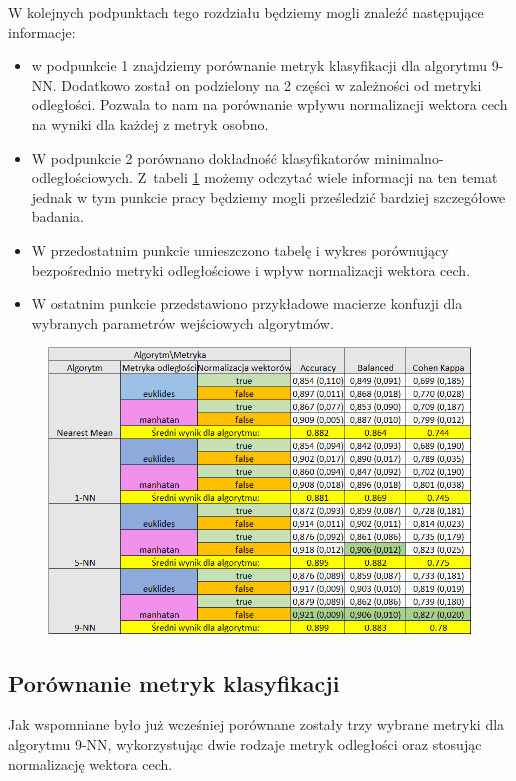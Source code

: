 \documentclass[12pt]{article}
\begin{document}
\noindent W kolejnych podpunktach tego rozdziału będziemy mogli znaleźć następujące informacje:
\begin{itemize}
\item w podpunkcie 1 znajdziemy porównanie metryk klasyfikacji dla algorytmu 9-NN. Dodatkowo został on podzielony na 2 części w zależności od metryki odległości. Pozwala to nam na porównanie wpływu normalizacji wektora cech na wyniki dla każdej z metryk osobno.
\item W podpunkcie 2 porównano dokładność klasyfikatorów minimalno-odległościowych. Z~tabeli \ref{glowna_tabela} możemy odczytać wiele informacji na ten temat jednak w tym punkcie pracy będziemy mogli prześledzić bardziej szczegółowe badania.
\item W przedostatnim punkcie umieszczono tabelę i wykres porównujący bezpośrednio metryki odległościowe i wpływ normalizacji wektora cech.
\item W ostatnim punkcie przedstawiono przykładowe macierze konfuzji dla wybranych parametrów wejściowych algorytmów.
\end{itemize}
\newpage 
\begin{figure}[H]
	\centering
	\label{glowna_tabela}
		\includegraphics[scale=0.75]{images/ogolna_tabela.png}
\end{figure}


\subsection{Porównanie metryk klasyfikacji}
\indent Jak wspomniane było już wcześniej porównane zostały trzy wybrane metryki dla algorytmu 9-NN, wykorzystując dwie rodzaje metryk odległości oraz stosując normalizację wektora cech.
\end{document}
